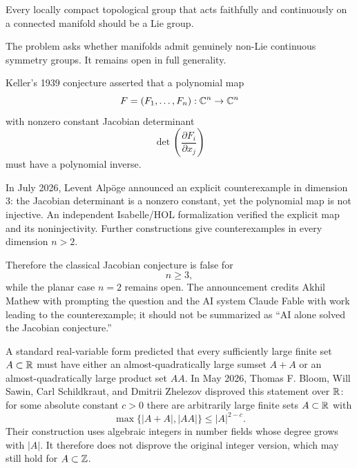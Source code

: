     \begin{openproblem}
        Every locally compact topological group that acts faithfully and
        continuously on a connected manifold should be a Lie group.
    \end{openproblem}

    \begin{remark}
        The problem asks whether manifolds admit genuinely non-Lie continuous
        symmetry groups. It remains open in full generality.
    \end{remark}

    \begin{fact}
        Keller's 1939 conjecture asserted that a polynomial map
        \[
            F=(F_1,\dots,F_n):\mathbb{C}^n\to\mathbb{C}^n
        \]
        with nonzero constant Jacobian determinant
        \[
            \det\left(
                \frac{\partial F_i}{\partial x_j}
            \right)
        \]
        must have a polynomial inverse.

        In July 2026, Levent Alpöge announced an explicit counterexample in
        dimension $3$: the Jacobian determinant is a nonzero constant, yet the
        polynomial map is not injective. An independent Isabelle/HOL
        formalization verified the explicit map and its noninjectivity. Further
        constructions give counterexamples in every dimension $n>2$.

        Therefore the classical Jacobian conjecture is false for
        \[
            n\geq 3,
        \]
        while the planar case $n=2$ remains open. The announcement credits
        Akhil Mathew with prompting the question and the AI system Claude Fable
        with work leading to the counterexample; it should not be summarized as
        ``AI alone solved the Jacobian conjecture.''
    \end{fact}


    \begin{fact}
        A standard real-variable form predicted that every sufficiently large
        finite set $A\subset\mathbb{R}$ must have either an almost-quadratically large
        sumset $A+A$ or an almost-quadratically large product set $AA$. In May
        2026, Thomas F. Bloom, Will Sawin, Carl Schildkraut, and Dmitrii Zhelezov
        disproved this statement over $\mathbb{R}$: for some absolute constant $c>0$
        there are arbitrarily large finite sets $A\subset\mathbb{R}$ with
        \[
            \max\{|A+A|,|AA|\}\leq |A|^{2-c}.
        \]
        Their construction uses algebraic integers in number fields whose degree
        grows with $|A|$. It therefore does not disprove the original integer
        version, which may still hold for $A\subset\mathbb{Z}$.
    \end{fact}

